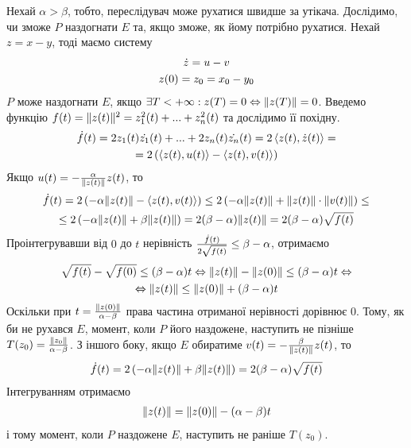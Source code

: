 Нехай $\alpha > \beta$, тобто, переслідувач може рухатися швидше за утікача. Дослідимо,
чи зможе $P$ наздогнати $E$ та, якщо зможе, як йому потрібно рухатися.
Нехай $z = x - y$, тоді маємо систему
\begin{gather*}
    \dot{z} = u - v \\
    z(0) = z_0 = x_0 - y_0
\end{gather*}
$P$ може наздогнати $E$, якщо $\exists T < +\infty : z(T) = 0 \Leftrightarrow \Vert z(T) \Vert = 0$.
Введемо функцію $f(t) = \Vert z(t) \Vert^2 = z_1^2(t) + ... + z_n^2(t)$ та дослідимо її похідну.
\begin{gather*}
    \dot{f}(t) = 2 z_1(t) \dot{z_1}(t) +  ... + 2 z_n(t) \dot{z_n}(t) =
    2 \left< z(t), \dot{z}(t)\right> = \\ = 2 \left(\left< z(t), u(t)\right> - \left< z(t), v(t)\right> \right)
\end{gather*}
Якщо $u(t) = - \frac{\alpha}{\Vert z(t) \Vert} z(t)$, то 
\begin{gather*}
    \dot{f}(t) = 2 \left( -\alpha \Vert z(t) \Vert - \left< z(t), v(t)\right>\right) \leq
    2 \left( -\alpha \Vert z(t) \Vert + \Vert z(t) \Vert\cdot \Vert v(t) \Vert\right) \leq \\
    \leq 2 \left( -\alpha \Vert z(t) \Vert + \beta \Vert z(t) \Vert\right) = 2(\beta - \alpha) \Vert z(t) \Vert = 
    2 (\beta - \alpha) \sqrt{f(t)}
\end{gather*}
Проінтегрувавши від $0$ до $t$ нерівність $\frac{\dot{f}(t)}{2\sqrt{f(t)}} \leq \beta - \alpha$,
отримаємо
\begin{gather*}
    \sqrt{f(t)} - \sqrt{f(0)} \leq (\beta - \alpha) t \Leftrightarrow
    \Vert z(t) \Vert - \Vert z(0) \Vert \leq (\beta - \alpha) t \Leftrightarrow \\ \Leftrightarrow
    \Vert z(t) \Vert \leq \Vert z(0) \Vert + (\beta - \alpha) t
\end{gather*}
Оскільки при $t = \frac{\Vert z(0) \Vert}{\alpha - \beta}$ права частина отриманої нерівності дорівнює 0.
Тому, як би не рухався $E$, момент, коли $P$ його наздожене, наступить не пізніше $T(z_0) = \frac{\Vert z_0 \Vert}{\alpha - \beta}$.
З іншого боку, якщо $E$ обиратиме $v(t) = -\frac{\beta}{\Vert z(t) \Vert} z(t)$, то
\begin{gather*}
    \dot{f}(t) = 2 \left(-\alpha \Vert z(t) \Vert + \beta \Vert z(t) \Vert\right) = 2(\beta - \alpha) \sqrt{f(t)}
\end{gather*}
Інтегруванням отримаємо
\begin{gather*}
    \Vert z(t) \Vert = \Vert z(0) \Vert - (\alpha - \beta) t
\end{gather*}
і тому момент, коли $P$ наздожене $E$, наступить не раніше $T(z_0)$.

